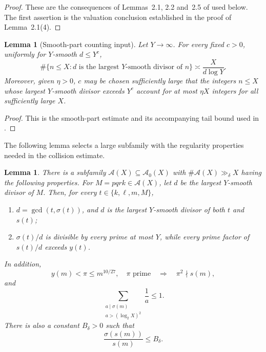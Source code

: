 \documentclass[11pt]{article}
\newtheorem{lemma}[theorem]{Lemma}
\theoremstyle{remark}
\newcommand{\1}{\mathbf 1}
\begin{document}
\begin{proof}
These are the consequences of Lemmas~2.1, 2.2 and~2.5 of
\cite{LucaPomerance} used below.  The first assertion is the valuation
conclusion established in the proof of Lemma~2.1(4).
\end{proof}

\begin{lemma}[Smooth-part counting input]\label{lem:smooth-part-input}
Let $Y\to\infty$.  For every fixed $c>0$, uniformly for $Y$-smooth
$d\leq Y^c$,
\[
 \#\{n\leq X:d\text{ is the largest $Y$-smooth divisor of }n\}
 \asymp \frac{X}{d\log Y}.
\]
Moreover, given $\eta>0$, $c$ may be chosen sufficiently large that the
integers $n\leq X$ whose largest $Y$-smooth divisor exceeds $Y^c$ account
for at most $\eta X$ integers for all sufficiently large $X$.
\end{lemma}

\begin{proof}
This is the smooth-part estimate and its accompanying tail bound used in
\cite[(3.1)]{LucaPomerance}.
\end{proof}

The following lemma selects a large subfamily with the regularity properties
needed in the collision estimate.

\begin{lemma}\label{lem:sv-regular}
There is a subfamily $\mathcal A(X)\subseteq\mathcal A_0(X)$ with
$\#\mathcal A(X)\gg_\delta X$ having the following properties.  For
$M=pqrk\in\mathcal A(X)$, let $d$ be the largest $Y$-smooth divisor of
$M$.  Then, for every $t\in\{k,\ell,m,M\}$,
\begin{enumerate}
\item $d=\gcd(t,\sigma(t))$, and $d$ is the largest $Y$-smooth divisor of
      both $t$ and $s(t)$;
\item $\sigma(t)/d$ is divisible by every prime at most $Y$, while every
      prime factor of $s(t)/d$ exceeds $y(t)$.
\end{enumerate}
In addition,
\[
 y(m)<\pi\leq m^{10/27},\quad \pi\text{ prime}
 \quad\Longrightarrow\quad \pi^2\nmid s(m),
\]
and
\begin{equation}\label{eq:sv-LP25}
  \sum_{\substack{a\mid\sigma(m)\\a>(\log_2X)^2}}\frac1a\leq1.
\end{equation}
There is also a constant $B_\delta>0$ such that
\begin{equation}\label{eq:sv-image-abundancy}
  \frac{\sigma(s(m))}{s(m)}\leq B_\delta.
\end{equation}
\end{lemma}
\end{document}
